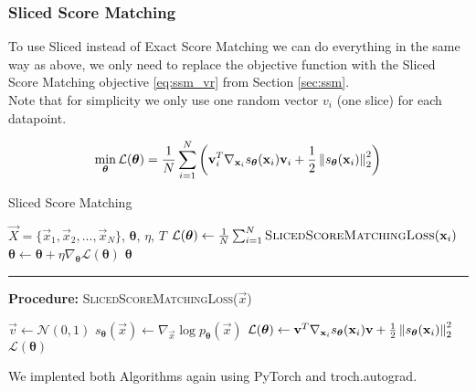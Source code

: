 \subsubsection{Sliced Score Matching}
\label{sec:gmm_ssm}

To use Sliced instead of Exact Score Matching we can do everything in the same way as above, we only need to replace 
the objective function with the Sliced Score Matching objective \ref{eq:ssm_vr} from Section \ref{sec:ssm}. \\
Note that for simplicity we only use one random vector $v_i$ (one slice) for each datapoint. 

\begin{equation}
    \min_{\substack{\boldsymbol{\theta}}} \mathcal{L}(\boldsymbol{\theta}) = \frac{1}{N} \sum_{i=1}^{N} \left( \vec{v}_i^T \nabla_{\vec x_i} s_{\boldsymbol{\theta}}(\vec x_i) \vec{v}_i + \frac{1}{2} \norm{  s_{\boldsymbol{\theta}}(\vec x_i) }^2_2 \right)
    \label{eq:ssm_optimization_problem}
\end{equation}

\begin{algorithm}[H]
    \caption{Sliced Score Matching}
    \begin{algorithmic}[1]  
        \Require $\vec X = \{\vec x_1, \vec x_2, ..., \vec x_N\}$, $\boldsymbol{\theta}$, $\eta$, $T$
            \State $\mathcal{L}(\boldsymbol{\theta}) \gets \frac{1}{N} \sum_{i=1}^N \textsc{SlicedScoreMatchingLoss}(\vec x_i)$
            \State $\boldsymbol{\theta} \gets \boldsymbol{\theta} + \eta \nabla_{\boldsymbol{\theta}} \mathcal{L}(\boldsymbol{\theta})$
        \EndFor
        \State \Return $\boldsymbol{\theta}$
        \end{algorithmic}
        \noindent\rule{\linewidth}{0.4pt} %
        \textbf{Procedure:} \textsc{SlicedScoreMatchingLoss}($\vec x$)
        \begin{algorithmic}[1]
            \State $\vec v \gets \mathcal{N}(0, 1)$
            \State $s_{\boldsymbol{\theta}}(\vec x) \gets \nabla_{\vec x} \log p_{\boldsymbol{\theta}}(\vec x)$
            \State $\mathcal{L}(\boldsymbol{\theta}) \gets \vec{v}^T \nabla_{\vec x_i} s_{\boldsymbol{\theta}}(\vec x_i) \vec{v} + \frac{1}{2} \norm{  s_{\boldsymbol{\theta}}(\vec x_i) }^2_2$
            \State \Return $\mathcal{L}(\boldsymbol{\theta})$
        \end{algorithmic}
\end{algorithm}

We implented both Algorithms again using PyTorch \cite{pytorch} and troch.autograd. 

